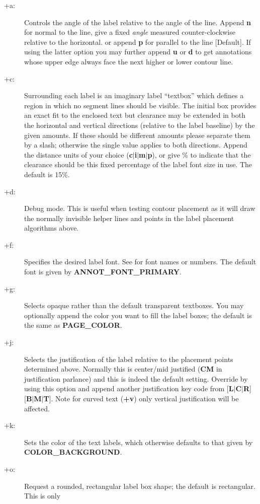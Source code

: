 \begin{description}
\item [+a:]  Controls the angle of the label relative to the angle of the line.  Append {\bf n}
for normal to the line, give a fixed {\it angle} measured counter-clockwise relative to the
horizontal. or append {\bf p} for parallel to the line [Default].  If using 
the latter option you may further append {\bf u} or {\bf d} to get annotations whose upper edge
always face the next higher or lower contour line.
\item [+c:] Surrounding each label is an imaginary label ``textbox'' which defines a region in
which no segment lines should be visible.  The initial box provides an exact fit to the enclosed
text but clearance may be extended in both the horizontal and vertical directions (relative to the label
baseline) by the given amounts.  If these should be different amounts please separate them by
a slash; otherwise the single value applies to both directions.  Append the distance units of
your choice ({\bf c$|$i$|$m$|$p}), or give \% to indicate that the clearance should be this
fixed percentage of the label font size in use.  The default is 15\%.
\item [+d:] Debug mode.  This is useful when testing contour placement as it will draw the normally
invisible helper lines and points in the label placement algorithms above.
\item [+f:] Specifies the desired label font.  See  for font names or numbers.  The
default font is given by {\bf ANNOT\_FONT\_PRIMARY}.
\item [+g:] Selects opaque rather than the default transparent textboxes.  You may optionally append
the color you want to fill the label boxes; the default is the same as {\bf PAGE\_COLOR}.
\item [+j:] Selects the justification of the label relative to the placement points determined
above.  Normally this is center/mid justified ({\bf CM} in  justification parlance) and
this is indeed the default setting.  Override by using this option and append another justification
key code from [{\bf L$|$C$|$R}][{\bf B$|$M$|$T}].  Note for curved text ({\bf +v}) only vertical
justification will be affected.
\item [+k:] Sets the color of the text labels, which otherwise defaults to that given by {\bf COLOR\_BACKGROUND}.
\item [+o:] Request a rounded, rectangular label box shape; the default is rectangular.  This is only

\end{description}
